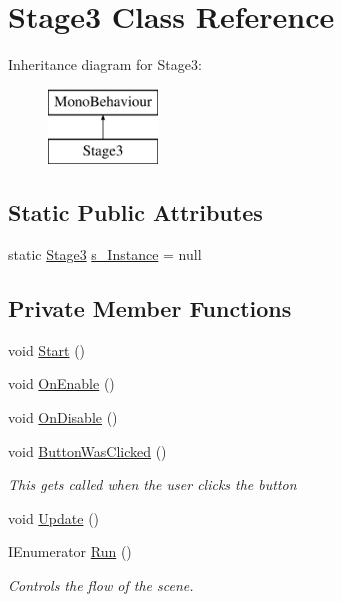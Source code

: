 \hypertarget{class_stage3}{}\section{Stage3 Class Reference}
\label{class_stage3}
Inheritance diagram for Stage3\+:\begin{figure}[H]
\begin{center}
\leavevmode
\includegraphics[height=2.000000cm]{class_stage3}
\end{center}
\end{figure}
\subsection*{Static Public Attributes}
\begin{DoxyCompactItemize}
\item 
static \mbox{\hyperlink{class_stage3}{Stage3}} \mbox{\hyperlink{class_stage3_ad7d6de393aa63c520bcbf0385ace2217}{s\+\_\+\+Instance}} = null
\end{DoxyCompactItemize}
\subsection*{Private Member Functions}
\begin{DoxyCompactItemize}
\item 
void \mbox{\hyperlink{class_stage3_a2055cf61814f4e7a414bc971c7ab81eb}{Start}} ()
\item 
void \mbox{\hyperlink{class_stage3_a52931a93bc0d482e2addeda6f41b7d6c}{On\+Enable}} ()
\item 
void \mbox{\hyperlink{class_stage3_a41463491a3a1b6640d0cc22a19de2dfa}{On\+Disable}} ()
\item 
void \mbox{\hyperlink{class_stage3_a5c1a079dcce9bb1d77bfe427d82d705c}{Button\+Was\+Clicked}} ()
\begin{DoxyCompactList}\small\item\em This gets called when the user clicks the button \end{DoxyCompactList}\item 
void \mbox{\hyperlink{class_stage3_a71d7781de4de72fb87bc733c1143d4c4}{Update}} ()
\item 
I\+Enumerator \mbox{\hyperlink{class_stage3_a3ebce4adf62b36d8987f00fe73a37a38}{Run}} ()
\begin{DoxyCompactList}\small\item\em Controls the flow of the scene. \end{DoxyCompactList}\end{DoxyCompactItemize}
